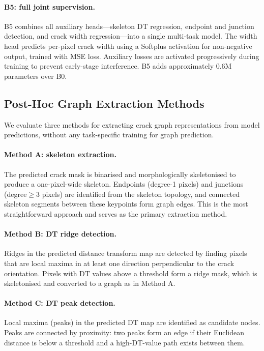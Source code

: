 \documentclass[preprint,12pt]{elsarticle}
\begin{document}
\paragraph{B5: full joint supervision.}
B5 combines all auxiliary heads---skeleton DT regression, endpoint and junction detection, and crack width regression---into a single multi-task model. The width head predicts per-pixel crack width using a Softplus activation for non-negative output, trained with MSE loss. Auxiliary losses are activated progressively during training to prevent early-stage interference. B5 adds approximately 0.6M parameters over B0.

\subsection{Post-Hoc Graph Extraction Methods}
\label{sec:graph_extraction}

We evaluate three methods for extracting crack graph representations from model predictions, without any task-specific training for graph prediction.

\paragraph{Method A: skeleton extraction.}
The predicted crack mask is binarised and morphologically skeletonised to produce a one-pixel-wide skeleton. Endpoints (degree-1 pixels) and junctions (degree$\geq$3 pixels) are identified from the skeleton topology, and connected skeleton segments between these keypoints form graph edges. This is the most straightforward approach and serves as the primary extraction method.

\paragraph{Method B: DT ridge detection.}
Ridges in the predicted distance transform map are detected by finding pixels that are local maxima in at least one direction perpendicular to the crack orientation. Pixels with DT values above a threshold form a ridge mask, which is skeletonised and converted to a graph as in Method A.

\paragraph{Method C: DT peak detection.}
Local maxima (peaks) in the predicted DT map are identified as candidate nodes. Peaks are connected by proximity: two peaks form an edge if their Euclidean distance is below a threshold and a high-DT-value path exists between them.
\end{document}
